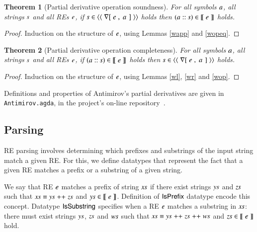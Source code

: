 \documentclass[review]{elsarticle}
\newtheorem{Theorem}{Theorem}
\newcommand{\D}[1]{\blue{\mathsf{#1}}}
\newcommand{\F}[1]{\green{\mathsf{#1}}}
\newcommand{\V}[1]{\purple{\mathit{#1}}}
\begin{document}
\begin{Theorem}[Partial derivative operation soundness]
For all symbols \ensuremath{\V{a}}, all strings \ensuremath{\V{s}} and all REs \ensuremath{\V{e}}, if \ensuremath{\V{s}\;\D{\in\langle\langle}\;\F{\nabla[}\;\V{e}\;\red{,}\,\;\V{a}\;\mskip1.5mu]\;\D{\rangle\rangle}} holds then \ensuremath{(\V{a}\;\V{::}\;\V{s})\;\D{\in\llbracket}\;\V{e}\;\D{\rrbracket}} holds.
\end{Theorem}
\begin{proof}
  Induction on the structure of \ensuremath{\V{e}}, using Lemmas \ref{wapp} and \ref{wopeq}.
\end{proof}

\begin{Theorem}[Partial derivative operation completeness]
For all symbols \ensuremath{\V{a}}, all strings \ensuremath{\V{s}} and all REs \ensuremath{\V{e}}, if \ensuremath{(\V{a}\;\V{::}\;\V{s})\;\D{\in\llbracket}\;\V{e}\;\D{\rrbracket}} holds then \ensuremath{\V{s}\;\D{\in\langle\langle}\;\F{\nabla[}\;\V{e}\;\red{,}\,\;\V{a}\;\mskip1.5mu]\;\D{\rangle\rangle}} holds.
\end{Theorem}
\begin{proof}
  Induction on the structure  of \ensuremath{\V{e}}, using Lemmas \ref{wl}, \ref{wr} and \ref{wop}.
\end{proof}

Definitions and properties of Antimirov's partial derivatives are given in
\texttt{Antimirov.agda}, in the project's on-line
repository~\cite{regex-rep}.

\subsection{Parsing}

RE parsing involves determining which prefixes and substrings of the
input string match a given RE. For this, we define datatypes that
represent the fact that a given RE matches a prefix or a substring of
a given string.


We say that RE \ensuremath{\V{e}} matches a prefix of string \ensuremath{\V{xs}} if there exist
strings \ensuremath{\V{ys}} and \ensuremath{\V{zs}} such that \ensuremath{\V{xs}\;\D{\equiv}\;\V{ys}\;\F{++}\;\V{zs}} and \ensuremath{\V{ys}\;\D{\in\llbracket}\;\V{e}\;\D{\rrbracket}}. Definition of \ensuremath{\D{IsPrefix}} datatype encode this concept. Datatype
\ensuremath{\D{IsSubstring}} specifies when a RE \ensuremath{\V{e}} matches a substring in \ensuremath{\V{xs}}:
there must exist strings \ensuremath{\V{ys}}, \ensuremath{\V{zs}} and \ensuremath{\V{ws}} such that \ensuremath{\V{xs}\;\D{\equiv}\;\V{ys}\;\F{++}\;\V{zs}\;\F{++}\;\V{ws}} and \ensuremath{\V{zs}\;\D{\in\llbracket}\;\V{e}\;\D{\rrbracket}} hold.
\end{document}
